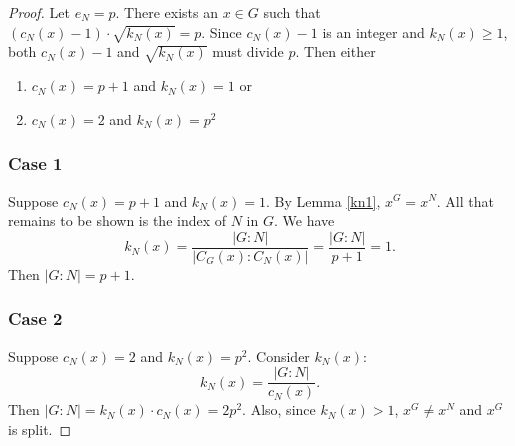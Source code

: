 \documentclass[main.tex]{subfiles}
\begin{document}
\begin{proof}
Let $e_N = p$. There exists an $x \in G$ such that $(c_N(x) - 1) \cdot \sqrt{k_N(x)} = p$. Since $c_N(x) - 1$ is an integer and $k_N(x) \ge 1$, both $c_N(x) - 1$ and $\sqrt{k_N(x)}$ must divide $p$. Then either
\begin{enumerate}
	\item $c_N(x) = p + 1$ and $k_N(x) = 1$ or
	\item $c_N(x) = 2$ and $k_N(x) = p^2$
\end{enumerate}

\subsubsection*{Case 1} Suppose $c_N(x) = p + 1$ and $k_N(x) = 1$. By Lemma \ref{kn1}, $x^G = x^N$. All that remains to be shown is the index of $N$ in $G$. We have
$$k_N(x) = \frac{|G : N|}{|C_G(x):C_N(x)|} = \frac{|G : N|}{p + 1} = 1\text{.}$$
Then $|G:N| = p+1$.

\subsubsection*{Case 2} Suppose $c_N(x) = 2$ and $k_N(x) = p^2$. Consider $k_N(x)$:
$$k_N(x) = \frac{|G:N|}{c_N(x)}\text{.}$$
Then $|G:N| = k_N(x) \cdot c_N(x) = 2p^2$. Also, since $k_N(x) > 1$, $x^G \ne x^N$ and $x^G$ is split.
\end{proof}
\end{document}
